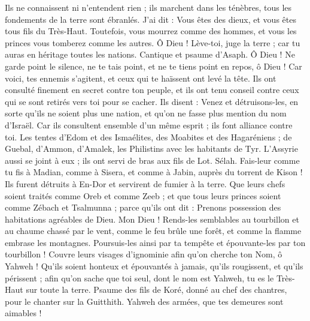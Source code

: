 \begin{multicols}{2}
Ils ne connaissent ni n'entendent rien ; ils marchent dans les ténèbres, tous les fondements de la terre sont ébranlés.
J'ai dit : Vous êtes des dieux, et vous êtes tous fils du Très-Haut.
Toutefois, vous mourrez comme des hommes, et vous les princes vous tomberez comme les autres.
Ô Dieu ! Lève-toi, juge la terre ; car tu auras en héritage toutes les nations.
\VerseOne{}Cantique et psaume d'Asaph.
Ô Dieu ! Ne garde point le silence, ne te tais point, et ne te tiens point en repos, ô Dieu !
Car voici, tes ennemis s'agitent, et ceux qui te haïssent ont levé la tête.
Ils ont consulté finement en secret contre ton peuple, et ils ont tenu conseil contre ceux qui se sont retirés vers toi pour se cacher.
Ils disent : Venez et détruisons-les, en sorte qu'ils ne soient plus une nation, et qu'on ne fasse plus mention du nom d'Israël.
Car ils consultent ensemble d'un même esprit ; ils font alliance contre toi.
Les tentes d'Edom et des Ismaélites, des Moabites et des Hagaréniens ;
de Guebal, d'Ammon, d'Amalek, les Philistins avec les habitants de Tyr.
L'Assyrie aussi se joint à eux ; ils ont servi de bras aux fils de Lot. Sélah.
Fais-leur comme tu fis à Madian, comme à Sisera, et comme à Jabin, auprès du torrent de Kison !
Ils furent détruits à En-Dor et servirent de fumier à la terre.
Que leurs chefs soient traités comme Oreb et comme Zeeb ; et que tous leurs princes soient comme Zébach et Tsalmunna ;
parce qu'ils ont dit : Prenons possession des habitations agréables de Dieu.
Mon Dieu ! Rends-les semblables au tourbillon et au chaume chassé par le vent,
comme le feu brûle une forêt, et comme la flamme embrase les montagnes.
Poursuis-les ainsi par ta tempête et épouvante-les par ton tourbillon !
Couvre leurs visages d'ignominie afin qu'on cherche ton Nom, ô Yahweh !
Qu'ils soient honteux et épouvantés à jamais, qu'ils rougissent, et qu'ils périssent ;
afin qu'on sache que toi seul, dont le nom est Yahweh, tu es le Très-Haut sur toute la terre.
\VerseOne{}Psaume des fils de Koré, donné au chef des chantres, pour le chanter sur la Guitthith.
Yahweh des armées, que tes demeures sont aimables !

\end{multicols}
